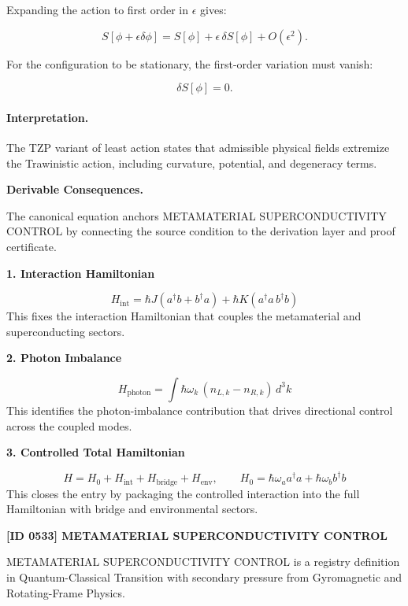 Expanding the action to first order in $\epsilon$ gives:

\begin{equation}
S[\phi+\epsilon\delta\phi]
=
S[\phi]
+
\epsilon\,\delta S[\phi]
+
O(\epsilon^2).
\end{equation}

For the configuration to be stationary, the first-order variation must vanish:

\begin{equation}
\boxed{
\delta S[\phi]=0 .
}
\end{equation}

\paragraph{Interpretation.}
The TZP variant of least action states that admissible physical fields extremize the Trawinistic action, including curvature, potential, and degeneracy terms.

\par\vspace{0.35em}
\noindent\textbf{Derivable Consequences.}\quad
\begingroup
\footnotesize
\raggedright
The canonical equation anchors METAMATERIAL SUPERCONDUCTIVITY CONTROL by connecting the source condition to the derivation layer and proof certificate.
\par\endgroup

\noindent\textbf{1. Interaction Hamiltonian}\par
\[
H_{\mathrm{int}}=\hbar J(a^\dagger b+b^\dagger a)+\hbar K(a^\dagger a\,b^\dagger b)
\]
\noindent This fixes the interaction Hamiltonian that couples the metamaterial and superconducting sectors.\par
\noindent\textbf{2. Photon Imbalance}\par
\[
H_{\mathrm{photon}}=\int \hbar \omega_k\,(n_{L,k}-n_{R,k})\,d^3k
\]
\noindent This identifies the photon-imbalance contribution that drives directional control across the coupled modes.\par
\noindent\textbf{3. Controlled Total Hamiltonian}\par
\[
H=H_0+H_{\mathrm{int}}+H_{\mathrm{bridge}}+H_{\mathrm{env}},\qquad H_0=\hbar\omega_a a^\dagger a+\hbar\omega_b b^\dagger b
\]
\noindent This closes the entry by packaging the controlled interaction into the full Hamiltonian with bridge and environmental sectors.\par

\clearpage
\noindent\textbf{[ID 0533] METAMATERIAL SUPERCONDUCTIVITY CONTROL}\par
\vspace{0.35em}
\begingroup\small
{}
METAMATERIAL SUPERCONDUCTIVITY CONTROL is a registry definition in Quantum-Classical Transition with secondary pressure from Gyromagnetic and Rotating-Frame Physics.

